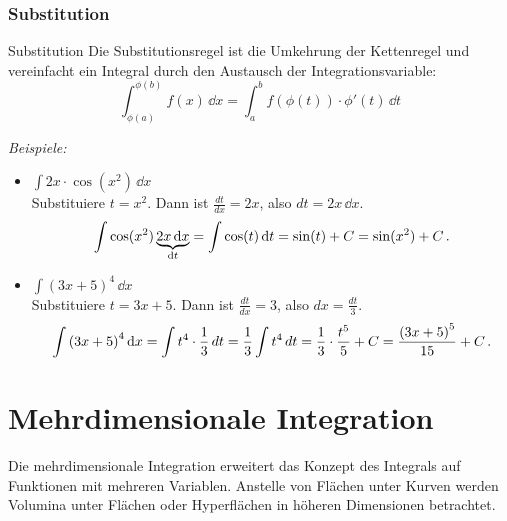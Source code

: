 \subsubsection{Substitution}
\begin{rememberbox}[]{Substitution}
Die Substitutionsregel ist die Umkehrung der Kettenregel und vereinfacht ein Integral durch den Austausch der Integrationsvariable:
    \begin{equation}
        \int_{\phi(a)}^{\phi(b)}f(x)\,\dd x = \int_{a}^{b}f(\phi(t))\cdot\phi'(t)\,\dd t
    \end{equation}
\end{rememberbox}
\textit{Beispiele:}
\begin{itemize}
    \item $\int 2x \cdot \cos(x^2) \,\dd x$ \\
    Substituiere $t = x^2$. Dann ist $\frac{dt}{dx} = 2x$, also $dt = 2x \,\dd x$.
    $$ \int \cos(x^2) \underbrace{2x\,\mathrm{d} x}_{\mathrm{d} t} = \int \cos(t) \,\mathrm{d} t = \sin(t) + C = \sin(x^2) + C \,.$$
    \item $\int {(3x+5)}^4 \,\dd x$ \\
    Substituiere $t = 3x+5$. Dann ist $\frac{dt}{dx} = 3$, also $dx = \frac{dt}{3}$.
    $$ \int {(3x+5)}^4 \,\mathrm{d} x = \int t^4 \cdot \frac{1}{3} \,dt = \frac{1}{3} \int t^4 \,dt = \frac{1}{3} \cdot \frac{t^5}{5} + C = \frac{{(3x+5)}^5}{15} + C \,.$$
\end{itemize}

\section{Mehrdimensionale Integration}\label{sec: Mehrdimensionale_Integration}
Die mehrdimensionale Integration erweitert das Konzept des Integrals auf Funktionen mit mehreren Variablen. Anstelle von Flächen unter Kurven werden Volumina unter Flächen oder Hyperflächen in höheren Dimensionen betrachtet.

